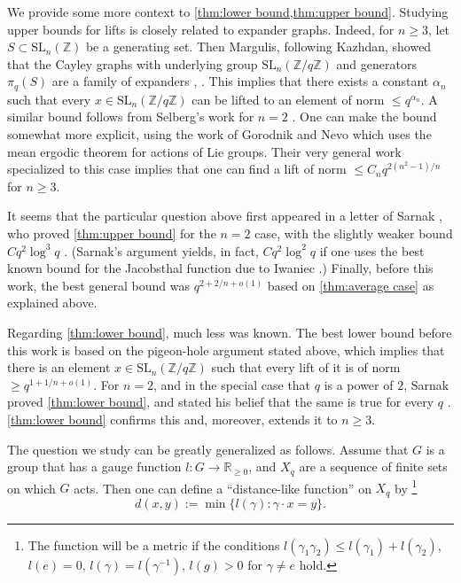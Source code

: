 \documentclass[12pt, a4paper]{amsart}
\numberwithin{equation}{section}
\theoremstyle{definition}
\newcommand{\R}{\mathbb{R}}
\newcommand{\Z}{\mathbb{Z}}
\newcommand{\SL}{\mathrm{SL}}
\begin{document}
We provide some more context to \cref{thm:lower bound,thm:upper bound}. Studying upper bounds for lifts is closely related to expander graphs. Indeed, for $n\ge3$, let $S\subset\SL_{n}(\Z)$ be a generating set. Then Margulis, following Kazhdan, showed that the Cayley graphs with underlying group $\SL_{n}(\Z/q\Z)$ and generators $\pi_{q}(S)$ are a family of expanders \cite{margulis1973explicit}, \cite[\S 3.3]{lubotzky1994discrete}. This implies that there exists a constant $\alpha_{n}$ such that every $x\in\SL_{n}(\Z/q\Z)$ can be lifted to an element of norm $\le q^{\alpha_{n}}$. A similar bound follows from Selberg's work for $n=2$ \cite[\S 4.4]{lubotzky1994discrete}. One can make the bound somewhat more explicit, using the work of Gorodnik and Nevo \cite[Theorem~1.1]{gorodnik2012lifting} which uses the mean ergodic theorem for actions of Lie groups. Their very general work specialized to this case implies that one can find a lift of norm $\le C_{n}q^{2(n^2-1)/n}$ for $n\ge3$. 

It seems that the particular question above first appeared in a letter of Sarnak \cite{sarnak2015lettermiller}, who proved \cref{thm:upper bound} for the $n=2$ case, with the slightly weaker bound $Cq^{2}\log^{3}q$ \cite[equation (20)]{sarnak2015lettermiller}.
(Sarnak's argument yields, in fact, $Cq^{2}\log^{2}q$ if one uses the best
known bound for the Jacobsthal function due to Iwaniec \cite{iwaniec1978}.)
Finally, before this work, the best general bound was $q^{2+2/n+o(1)}$ based on \cref{thm:average case} as explained above.

Regarding \cref{thm:lower bound}, much less was known. The best lower bound before this work is based on the pigeon-hole argument stated above, which implies that there is an element $x\in \SL_n(\Z/q\Z)$ such that every lift of it is of norm $\ge q^{1+1/n+o(1)}$. For $n=2$, and in the special case that $q$ is a power of $2$,
Sarnak proved \cref{thm:lower bound}, and stated his belief that the same is true for every $q$ \cite[Page 11]{sarnak2015lettermiller}. \cref{thm:lower bound} confirms this and, moreover, extends it to $n\ge3$.

The question we study can be greatly generalized as follows. Assume that $G$ is a group that has a gauge function $l\colon G\to\R_{\ge0}$,
and $X_{q}$ are a sequence of finite sets on which $G$ acts. Then one can define a ``distance-like function'' on $X_{q}$ by \footnote{The function will be a metric if the conditions $l(\gamma_{1}\gamma_{2})\le l(\gamma_{1})+l(\gamma_{2})$,
$l(e)=0$, $l(\gamma)=l(\gamma^{-1})$, $l(g)> 0$ for $\gamma\ne e$ hold.}
\[
d(x,y):=\min\{l(\gamma):\gamma\cdot x=y\}.
\]
\end{document}
